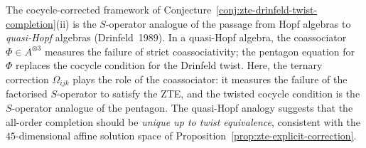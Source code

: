 \begin{remark}
\label{rem:zte-quasi-hopf}
The cocycle-corrected framework of Conjecture~\ref{conj:zte-drinfeld-twist-completion}(ii) is the $S$-operator analogue of the passage from Hopf algebras to \emph{quasi-Hopf} algebras (Drinfeld~1989). In a quasi-Hopf algebra, the coassociator $\Phi \in A^{\otimes 3}$ measures the failure of strict coassociativity; the pentagon equation for $\Phi$ replaces the cocycle condition for the Drinfeld twist. Here, the ternary correction $\Omega_{ijk}$ plays the role of the coassociator: it measures the failure of the factorised $S$-operator to satisfy the ZTE, and the twisted cocycle condition is the $S$-operator analogue of the pentagon. The quasi-Hopf analogy suggests that the all-order completion should be \emph{unique up to twist equivalence}, consistent with the $45$-dimensional affine solution space of Proposition~\ref{prop:zte-explicit-correction}.
\end{remark}

